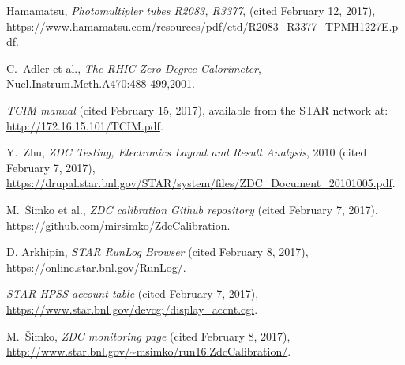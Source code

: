 \begin{thebibliography}{9}
 Hamamatsu, \textit{Photomultipler tubes R2083, R3377}, 
(cited February 12, 2017),
\url{https://www.hamamatsu.com/resources/pdf/etd/R2083_R3377_TPMH1227E.pdf}.

 C.\ Adler et al., \textit{The RHIC Zero Degree Calorimeter},
Nucl.Instrum.Meth.A470:488-499,2001.

 \textit{TCIM manual} (cited February 15, 2017), available from the STAR network 
at: \url{http://172.16.15.101/TCIM.pdf}.

 Y.\ Zhu, \textit{ZDC Testing, Electronics Layout and Result Analysis}, 2010
(cited February 7, 2017),
\url{https://drupal.star.bnl.gov/STAR/system/files/ZDC_Document_20101005.pdf}.

 M.\ Šimko et al., \textit{ZDC calibration Github repository}
(cited February 7, 2017), \url{https://github.com/mirsimko/ZdcCalibration}.

 D. Arkhipin, \textit{STAR RunLog Browser} (cited February 8, 2017),
\url{https://online.star.bnl.gov/RunLog/}.

 \textit{STAR HPSS account table} (cited February 7, 2017),
\url{https://www.star.bnl.gov/devcgi/display_accnt.cgi}.

 M.\ Šimko, \textit{ZDC monitoring page} (cited February 8, 2017),
\url{http://www.star.bnl.gov/~msimko/run16.ZdcCalibration/}.
\end{thebibliography}
